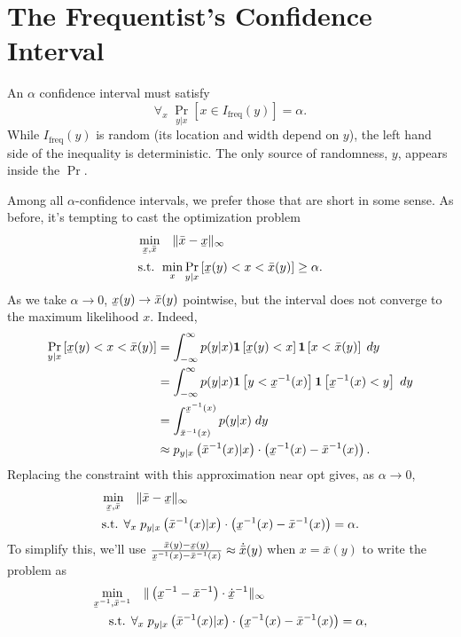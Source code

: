 \documentclass{article}
\newcommand{\Ifreq}{I_\text{freq}}
\newcommand{\xl}{\underaccent{\bar}{x}}
\newcommand{\xh}{\bar{x}}
\newcommand{\1}{\mathbf{1}}
\begin{document}
\section{The Frequentist's Confidence Interval}

An $\alpha$ confidence interval must satisfy
\begin{equation}
\forall_x\; \Pr_{y|x}\left[x \in \Ifreq(y)\right] = \alpha.
\end{equation}
While $\Ifreq(y)$ is random (its location and width depend on $y$), the left
hand side of the inequality is deterministic. The only source of randomness,
$y$, appears inside the $\Pr$. 

Among all $\alpha$-confidence intervals, we prefer those that are short in some
sense. As before, it's tempting to cast the optimization problem
\begin{align}\label{eq:freq-interval}
\min_{\xl, \xh} &\quad  \| \xh - \xl \|_\infty \\
\text{s.t. } & \min_x \Pr_{y|x}\left[\xl(y) < x < \xh(y) \right] \geq \alpha.
\end{align}
As we take $\alpha\to 0$, $\xl(y) \to \xh(y)$ pointwise, but the interval does not converge to the maximum likelihood $x$. Indeed,
\begin{align}
        \Pr_{y|x}\left[\xl(y) < x < \xh(y)\right] &= \int_{-\infty}^\infty p(y|x) \1\left[ \xl(y) < x\right] \1\left[x < \xh(y)\right] \;dy\\
        &= \int_{-\infty}^\infty p(y|x) \1\left[ y < \xl^{-1}(x)\right] \1\left[\xl^{-1}(x) < y\right] \;dy\\
        &= \int_{\xh^{-1}(x)}^{\xl^{-1}(x)} p(y|x)  \;dy\\
        &\approx p_{y|x}\left(\xh^{-1}(x) | x\right) \cdot \left(\xl^{-1}(x)-\xh^{-1}(x)\right).
\end{align}
Replacing the constraint with this approximation near opt gives, as $\alpha\to 0$,
\begin{align}\label{eq:non-mle}
  \min_{\xl, \xh} &\quad  \| \xh - \xl \|_\infty \\
  \text{s.t. } & \forall_x\; p_{y|x}\left(\xh^{-1}(x) | x\right) \cdot \left(\xl^{-1}(x)-\xh^{-1}(x)\right) = \alpha.
\end{align}
To simplify this, we'll use $\frac{\xh(y) - \xl(y)}{\xl^{-1}(x)-\xh^{-1}(x)} \approx \dot{\xh}(y)$ when $x = \xh(y)$ to write the problem as
\begin{align}
\min_{\xl^{-1}, \xh^{-1}} &\quad  \| \left(\xl^{-1} - \xh^{-1} \right) \cdot \dot{\xl}^{-1}\|_\infty \\
\text{s.t. } & \forall_x\; p_{y|x}\left(\xh^{-1}(x) | x\right) \cdot \left(\xl^{-1}(x)-\xh^{-1}(x)\right) = \alpha,
\end{align}
\end{document}
